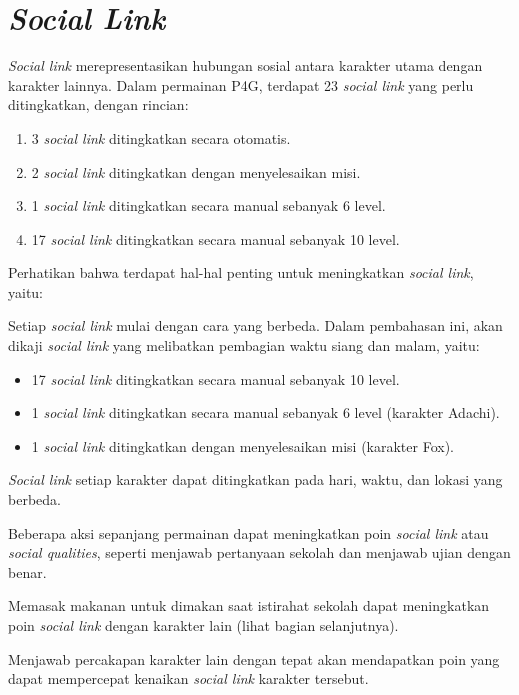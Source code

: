 \section{\textit{Social Link}}
\textit{Social link} merepresentasikan hubungan sosial antara karakter utama dengan karakter lainnya. Dalam permainan P4G, terdapat 23 \textit{social link} yang perlu ditingkatkan, dengan rincian:
\begin{enumerate}
    \item 3 \textit{social link} ditingkatkan secara otomatis.
    \item 2 \textit{social link} ditingkatkan dengan menyelesaikan misi.
    \item 1 \textit{social link} ditingkatkan secara manual sebanyak 6 level.
    \item 17 \textit{social link} ditingkatkan secara manual sebanyak 10 level.
\end{enumerate}
Perhatikan bahwa terdapat hal-hal penting untuk meningkatkan \textit{social link}, yaitu:
\begin{enumerate}
    {\item Setiap \textit{social link} mulai dengan cara yang berbeda. Dalam pembahasan ini, akan dikaji \textit{social link} yang melibatkan pembagian waktu siang dan malam, yaitu:
          \begin{itemize}
              \item 17 \textit{social link} ditingkatkan secara manual sebanyak 10 level.
              \item 1 \textit{social link} ditingkatkan secara manual sebanyak 6 level (karakter Adachi).
              \item 1 \textit{social link} ditingkatkan dengan menyelesaikan misi (karakter Fox).
          \end{itemize}
          }
    \item \textit{Social link} setiap karakter dapat ditingkatkan pada hari, waktu, dan lokasi yang berbeda.
    \item Beberapa aksi sepanjang permainan dapat meningkatkan poin \textit{social link} atau \textit{social qualities}, seperti menjawab pertanyaan sekolah dan menjawab ujian dengan benar.
    \item Memasak makanan untuk dimakan saat istirahat sekolah dapat meningkatkan poin \textit{social link} dengan karakter lain (lihat bagian selanjutnya).
    \item Menjawab percakapan karakter lain dengan tepat akan mendapatkan poin yang dapat mempercepat kenaikan \textit{social link} karakter tersebut.
\end{enumerate}

